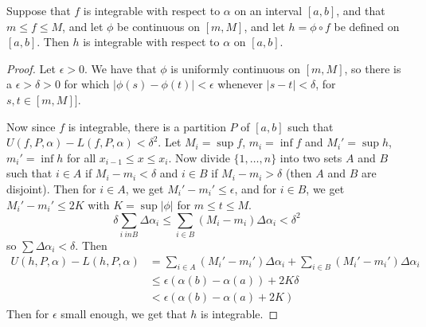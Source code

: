 \begin{theorem}\label{7.1.10}
    Suppose that $f$ is integrable with respect to  $\alpha$ on  an interval
    $[a,b]$, and that  $m \leq f \leq M$, and let  $\phi$ be continuous on
    $[m,M]$, and let  $h=\phi \circ f$ be defined on  $[a,b]$. Then  $h$ is
    integrable with respect to  $\alpha$ on  $[a,b]$.
\end{theorem}
\begin{proof}
    Let $\epsilon>0$. We have that  $\phi$ is uniformly continuous on $[m,M]$,
    so there is a $\epsilon>\delta>0$ for which $|\phi(s)-\phi(t)|<\epsilon$
    whenever  $|s-t|<\delta$, for  $s,t \in [m,M]]$.

    Now since $f$ is integrable, there is a partition  $P$ of  $[a,b]$ such that
    $U(f,P, \alpha)-L(f,P,\alpha)<\delta^2$. Let  $M_i=\sup{f}$, $m_i=\inf{f}$ and
    $M_i'=\sup{h}$, $m_i'=\inf{h}$ for all  $x_{i-1} \leq x \leq x_i$. Now
    divide  $\{1, \dots, n\}$ into two sets  $A$ and  $B$ such that  $i \in A$
    if  $M_i-m_i<\delta$ and  $i \in B$ if  $M_i-m_i>\delta$  (then $A$ and  $B$
    are disjoint). Then for $i \in A$, we get  $M_i'-m_i' \leq \epsilon$, and
for  $i \in B$, we get  $M_i'-m_i' \leq 2K$ with  $K=\sup{|\phi|}$ for  $m \leq
t \leq M$.
    \begin{equation*}
        \delta\sum_{i\ in B}{\Delta{\alpha_i}} \leq \sum_{i \in B}{(M_i-m_i)\Delta{\alpha_i}}<\delta^2
    \end{equation*}
    so $\sum{\Delta{\alpha_i}}<\delta$. Then
        \begin{align*}
            U(h,P,\alpha)-L(h,P,\alpha) &= \sum_{i \in A}{(M_i'-m_i')\Delta{\alpha_i}}+\sum_{i \in B}{(M_i'-m_i')\Delta{\alpha_i}} \\
                              &\leq \epsilon(\alpha(b)-\alpha(a))+2K\delta \\
                              &<\epsilon(\alpha(b)-\alpha(a)+2K)
        \end{align*}
    Then for $\epsilon$ small enough, we get that  $h$ is integrable.
\end{proof}
